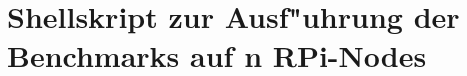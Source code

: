 \section{Shellskript zur Ausf"uhrung der Benchmarks auf n RPi-Nodes}\label{executeBenchmarksOnAllRPis.sh}

\endinput 


